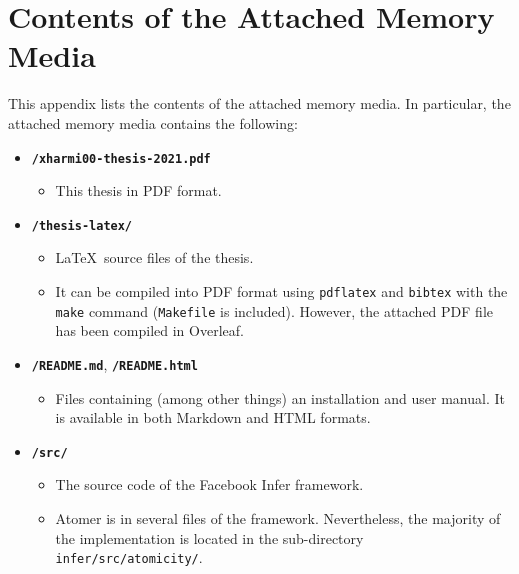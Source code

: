 




\chapter{Contents of the Attached Memory Media}
\label{app:memMedia}

This appendix lists the contents of the attached memory media. In particular, the attached memory media contains the following:
\begin{itemize}
    \item \texttt{\textbf{/xharmi00-thesis-2021.pdf}}
        \begin{itemize}
            \item This thesis in PDF format.
        \end{itemize}

    \item \texttt{\textbf{/thesis-latex/}}
        \begin{itemize}
            \item \LaTeX\ source files of the thesis.
            
            \item It can be compiled into PDF format using \texttt{pdflatex} and \texttt{bibtex} with the \texttt{make} command (\texttt{Makefile} is included). However, the attached PDF file has been compiled in Overleaf.
        \end{itemize}

    \item \texttt{\textbf{/README.md}}, \texttt{\textbf{/README.html}}
        \begin{itemize}
            \item Files containing (among other things) an installation and user manual. It is available in both Markdown and HTML formats.
        \end{itemize}
    
    \item \texttt{\textbf{/src/}}
        \begin{itemize}
            \item The source code of the Facebook Infer framework.
            
            \item Atomer is  in several files of the framework. Nevertheless, the majority of the implementation is located in the sub-directory \texttt{infer/src/atomicity/}.
        \end{itemize}
    

\end{itemize}
